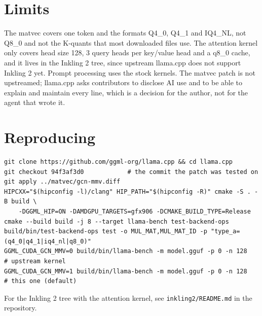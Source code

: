 \documentclass[11pt,a4paper]{article}
\newcommand{\code}[1]{\texttt{#1}}
\begin{document}
\section{Limits}

The matvec covers one token and the formats Q4\_0, Q4\_1 and IQ4\_NL, not Q8\_0 and not the K-quants that most
downloaded files use. The attention kernel only covers head size 128, 3 query heads per key/value head and a q8\_0 cache, and it
lives in the Inkling 2 tree, since upstream llama.cpp does not support Inkling 2 yet. Prompt processing uses the stock
kernels. The matvec patch is not upstreamed; llama.cpp asks contributors to disclose AI use and to be able to explain
and maintain every line, which is a decision for the author, not for the agent that wrote it.

\appendix
\section{Reproducing}

\begin{lstlisting}
git clone https://github.com/ggml-org/llama.cpp && cd llama.cpp
git checkout 94f3af3d0            # the commit the patch was tested on
git apply ../matvec/gcn-mmv.diff
HIPCXX="$(hipconfig -l)/clang" HIP_PATH="$(hipconfig -R)" cmake -S . -B build \
    -DGGML_HIP=ON -DAMDGPU_TARGETS=gfx906 -DCMAKE_BUILD_TYPE=Release
cmake --build build -j 8 --target llama-bench test-backend-ops
build/bin/test-backend-ops test -o MUL_MAT,MUL_MAT_ID -p "type_a=(q4_0|q4_1|iq4_nl|q8_0)"
GGML_CUDA_GCN_MMV=0 build/bin/llama-bench -m model.gguf -p 0 -n 128   # upstream kernel
GGML_CUDA_GCN_MMV=1 build/bin/llama-bench -m model.gguf -p 0 -n 128   # this one (default)
\end{lstlisting}
For the Inkling 2 tree with the attention kernel, see \code{inkling2/README.md} in the repository.
\end{document}
